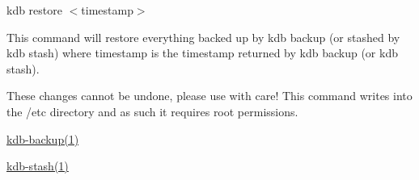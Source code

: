 {\ttfamily kdb restore $<$timestamp$>$}

This command will restore everything backed up by {\ttfamily kdb backup} (or stashed by {\ttfamily kdb stash}) where {\ttfamily timestamp} is the timestamp returned by {\ttfamily kdb backup} (or {\ttfamily kdb stash}).

These changes cannot be undone, please use with care! This command writes into the {\ttfamily /etc} directory and as such it requires root permissions.


\begin{DoxyCode}{0}
\end{DoxyCode}



\begin{DoxyItemize}
\item \mbox{\hyperlink{doc_help_kdb-backup_md}{kdb-\/backup(1)}}
\item \mbox{\hyperlink{doc_help_kdb-stash_md}{kdb-\/stash(1)}} 
\end{DoxyItemize}